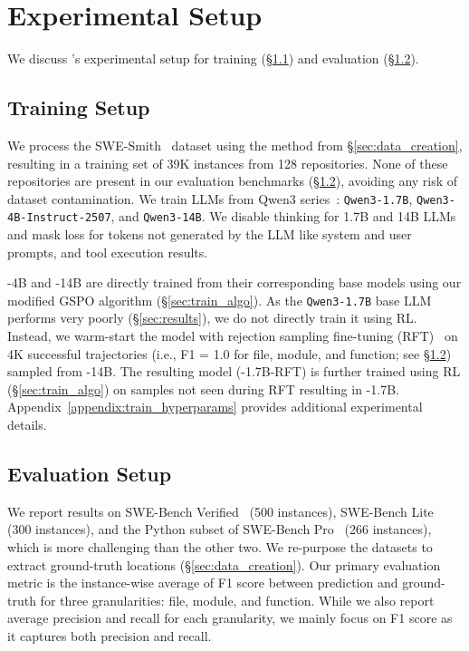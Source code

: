 
\section{Experimental Setup}
\label{sec:experiments}

We discuss \methodname's experimental setup for training (\S\ref{sec:train_setup}) and evaluation (\S\ref{sec:eval_benchmarks}).

\subsection{Training Setup}\label{sec:train_setup}
We process the SWE-Smith~\citep{yang2025swesmithscalingdatasoftware} dataset using the method from \S\ref{sec:data_creation}, resulting in a training set of 39K instances from 128 repositories. None of these repositories are present in our evaluation benchmarks (\S\ref{sec:eval_benchmarks}), avoiding any risk of dataset contamination. We train LLMs from Qwen3 series~\citep{yang2025qwen3technicalreport}: \texttt{Qwen3-1.7B}, \texttt{Qwen3-4B-Instruct-2507}, and \texttt{Qwen3-14B}. We disable thinking for 1.7B and 14B LLMs and mask loss for tokens not generated by the LLM like system and user prompts, and tool execution results.

\methodname-4B and \methodname-14B are directly trained from their corresponding base models using our modified GSPO algorithm (\S\ref{sec:train_algo}). As the \texttt{Qwen3-1.7B} base LLM performs very poorly (\S\ref{sec:results}), we do not directly train it using RL. Instead, we warm-start the model with rejection sampling fine-tuning (RFT)~\citep{yuan2023scalingrelationshiplearningmathematical} on 4K successful trajectories (i.e., F1 = 1.0 for file, module, and function; see \S\ref{sec:eval_benchmarks}) sampled from \methodname-14B. The resulting model (\methodname-1.7B-RFT) is further trained using RL (\S\ref{sec:train_algo}) on samples not seen during RFT resulting in \methodname-1.7B. Appendix~\ref{appendix:train_hyperparams} provides additional experimental details. 
\subsection{Evaluation Setup}\label{sec:eval_benchmarks}

We report results on SWE-Bench Verified~\citep{chowdhury2024swebenchverified} (500 instances), SWE-Bench Lite~\citep{jimenez2024swebenchlanguagemodelsresolve} (300 instances), and the Python subset of SWE-Bench Pro~\citep{deng2025swebenchproaiagents} (266 instances), which is more challenging than the other two. We re-purpose the datasets to extract ground-truth locations (\S\ref{sec:data_creation}). Our primary evaluation metric is the instance-wise average of F1 score between prediction and ground-truth for three granularities: file, module, and function. While we also report average precision and recall for each granularity, we mainly focus on F1 score as it captures both precision and recall.

